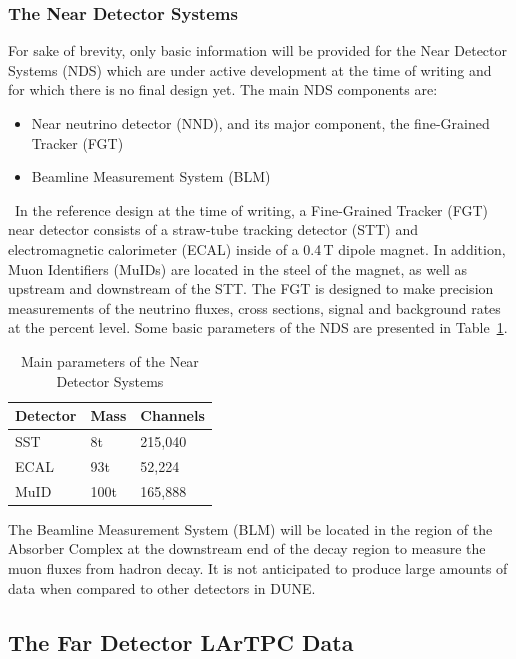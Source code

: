 \subsubsection{The Near Detector Systems}
\label{sec:nds-params}
For sake of brevity, only basic information will be provided for the Near Detector Systems (NDS) which are under active development
at the time of writing and for which there is no final design yet. The main NDS components are:
\begin{itemize}
\item Near neutrino detector (NND), and its major component, the fine-Grained Tracker (FGT)
\item Beamline Measurement System (BLM)
\end{itemize}
\ 
In the reference design at the time of writing, a Fine-Grained Tracker (FGT) near detector consists of a straw-tube
tracking detector (STT) and electromagnetic calorimeter (ECAL) inside of a 0.4\,T dipole magnet.
In addition, Muon Identifiers (MuIDs) are located in the steel of the magnet, as well as upstream
and downstream of the STT. The FGT is designed to make precision measurements of the neutrino
fluxes, cross sections, signal and background rates at the percent level. Some basic parameters of the
NDS are presented in Table~\ref{tab:nds-params}.
\begin{table}[ht!]
\centering
\begin{tabular}{| p{1in} | p{1in} | p{1in} |}		\hline		
\textbf{Detector} & \textbf{Mass} & \textbf{Channels} \\ \hline
SST & 8t & 215,040 \\ \hline
ECAL & 93t & 52,224 \\ \hline
MuID & 100t & 165,888 \\ \hline
\end{tabular}
\caption{Main parameters of the Near Detector Systems}
\label{tab:nds-params}
\end{table}

The Beamline Measurement System (BLM) will be located in the region of the Absorber Complex
at the downstream end of the decay region to measure the muon fluxes from hadron decay.
It is not anticipated to produce large amounts of data when compared to other detectors in DUNE.

\subsection{The Far Detector LArTPC Data}

